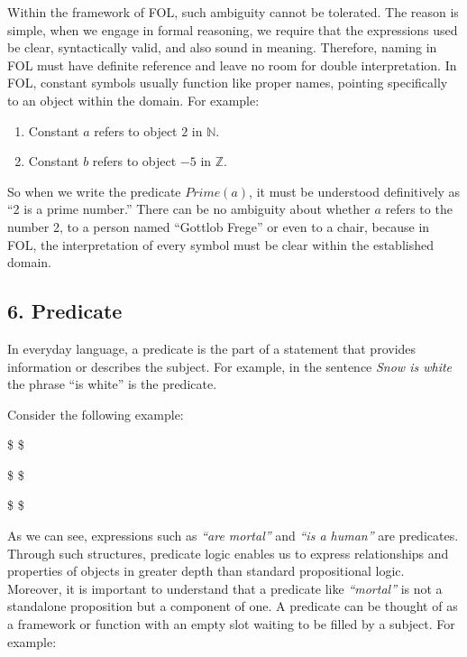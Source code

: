 Within the framework of FOL, such ambiguity cannot be tolerated. The
reason is simple, when we engage in formal reasoning, we require that
the expressions used be clear, syntactically valid, and also sound in
meaning. Therefore, naming in FOL must have definite reference and leave
no room for double interpretation. In FOL, constant symbols usually
function like proper names, pointing specifically to an object within
the domain. For example:

\begin{enumerate}
\def\labelenumi{\arabic{enumi}.}
\item
  Constant \(a\) refers to object \(2\) in \(\mathbb{N}\).
\item
  Constant \(b\) refers to object \(-5\) in \(\mathbb{Z}\).
\end{enumerate}

So when we write the predicate \(Prime(a)\), it must be understood
definitively as ``2 is a prime number.'' There can be no ambiguity about
whether \(a\) refers to the number 2, to a person named ``Gottlob
Frege'' or even to a chair, because in FOL, the interpretation of every
symbol must be clear within the established domain.

\subsection{6. Predicate}\label{predicate}

In everyday language, a predicate is the part of a statement that
provides information or describes the subject. For example, in the
sentence \emph{Snow is white} the phrase ``is white'' is the predicate.

Consider the following example:

\$ \$

\$ \$

\$ \$

As we can see, expressions such as \emph{``are mortal''} and \emph{``is
a human''} are predicates. Through such structures, predicate logic
enables us to express relationships and properties of objects in greater
depth than standard propositional logic. Moreover, it is important to
understand that a predicate like \emph{``mortal''} is not a standalone
proposition but a component of one. A predicate can be thought of as a
framework or function with an empty slot waiting to be filled by a
subject. For example:

